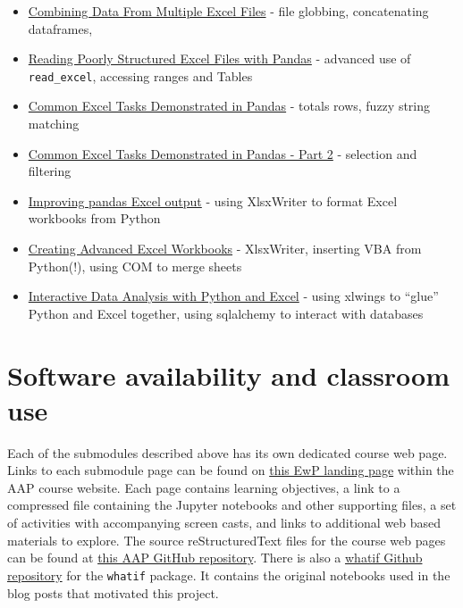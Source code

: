 \documentclass[ited]{informs3}                      %
\newcommand{\code}[1]{\texttt{#1}}
\begin{document}
\begin{itemize}
	\item
	\href{https://pbpython.com/excel-file-combine.html}{Combining Data
		From Multiple Excel Files} - file globbing, concatenating dataframes,
	\item
	\href{https://pbpython.com/pandas-excel-range.html}{Reading Poorly
		Structured Excel Files with Pandas} - advanced use of
	\texttt{read\_excel}, accessing ranges and Tables
	\item
	\href{https://pbpython.com/excel-pandas-comp.html}{Common Excel Tasks
		Demonstrated in Pandas} - totals rows, fuzzy string matching
	\item
	\href{https://pbpython.com/excel-pandas-comp-2.html}{Common Excel
		Tasks Demonstrated in Pandas - Part 2} - selection and filtering
	\item
	\href{https://pbpython.com/improve-pandas-excel-output.html}{Improving
		pandas Excel output} - using XlsxWriter to format Excel workbooks from
	Python
	\item
	\href{https://pbpython.com/advanced-excel-workbooks.html}{Creating
		Advanced Excel Workbooks} - XlsxWriter, inserting VBA from Python(!),
	using COM to merge sheets
	\item
	\href{https://pbpython.com/xlwings-pandas-excel.html}{Interactive Data
		Analysis with Python and Excel} - using xlwings to ``glue'' Python and
	Excel together, using sqlalchemy to interact with databases
\end{itemize}


\section{Software availability and classroom use}
\label{sec:software}

Each of the submodules described above has its own dedicated course web page. Links to each submodule page can be found on \href{http://www.sba.oakland.edu/faculty/isken/courses/aap/mod3_excel_with_python.html}{this EwP landing page} within the AAP course website. Each page contains learning objectives, a link to a compressed file containing the Jupyter notebooks and other supporting files, a set of activities with accompanying screen casts, and links to additional web based materials to explore. The source reStructuredText files for the course web pages can be found at \href{https://github.com/misken/aap}{this AAP GitHub repository}. There is also a \href{https://github.com/misken/whatif}{whatif Github repository} for the \code{whatif} package. It contains the original notebooks used in the blog posts that motivated this project.
\end{document}
